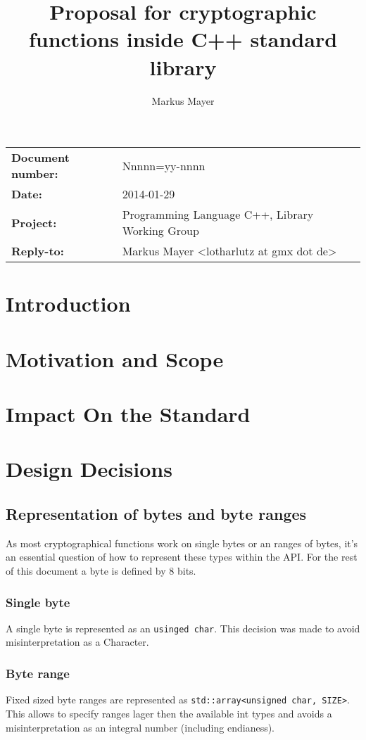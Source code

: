\documentclass[10pt,letterpaper]{article}
\title{Proposal for cryptographic functions inside C++ standard library}
\author{Markus Mayer}
\begin{document}
\maketitle
\begin{center}
\begin{tabular}[b]{ll}
\textbf{Document number:} & Nnnnn=yy-nnnn \\ 
\textbf{Date:} & 2014-01-29 \\ 
\textbf{Project:} & Programming Language C++, Library Working Group \\ 
\textbf{Reply-to:} & Markus Mayer <lotharlutz at gmx dot de> \\ 
\end{tabular} 
\end{center}
\pagebreak
\tableofcontents
\pagebreak
\section{Introduction}
\section{Motivation and Scope}
\section{Impact On the Standard}
\section{Design Decisions}
\subsection{Representation of bytes and byte ranges}
As most cryptographical functions work on single bytes or an ranges of bytes, it's an essential question of how to represent these types within the API. For the rest of this document a byte is defined by 8 bits.
\subsubsection*{Single byte}
A single byte is represented as an \texttt{usinged char}. This decision was made to avoid misinterpretation as a Character.

\subsubsection*{Byte range}
Fixed sized byte ranges are represented as \texttt{std::array<unsigned char, SIZE>}. This allows to specify ranges lager then the available int types and avoids a misinterpretation as an integral number (including endianess).
\end{document}

